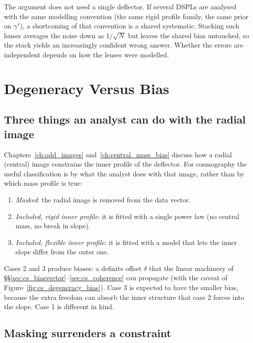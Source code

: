 \begin{annotation}
The argument does not need a single deflector. If several DSPLs are
analysed with the same modelling convention (the same rigid
profile family, the same prior on $\gamma'$), a shortcoming of that
convention is a shared systematic. Stacking such lenses averages the
noise down as $1/\sqrt N$ but leaves the shared bias untouched, so the
stack yields an increasingly confident wrong answer. Whether the errors
are independent depends on how the lenses were modelled.
\end{annotation}


\section{Degeneracy Versus Bias}
\label{sec:cs_degeneracy}

\subsection{Three things an analyst can do with the radial image}

Chapters~\ref{ch:odd_images} and~\ref{ch:central_mass_bias} discuss how
a radial (central) image constrains the inner profile of the deflector.
For cosmography the useful classification is by what the analyst does
with that image, rather than by which mass profile is true:
\begin{enumerate}
  \item \emph{Masked}: the radial image is removed from the data
  vector.
  \item \emph{Included, rigid inner profile}: it is fitted with a
  single power law (no central mass, no break in slope).
  \item \emph{Included, flexible inner profile}: it is fitted with a
  model that lets the inner slope differ from the outer one.
\end{enumerate}
Cases 2 and 3 produce biases: a definite offset $\delta$ that the
linear machinery of
\S\S\ref{sec:cs_biasvector}--\ref{sec:cs_coherence} can propagate (with
the caveat of Figure~\ref{fig:cs_degeneracy_bias}). Case 3 is expected
to have the smaller bias, because the extra freedom can absorb the inner
structure that case 2 forces into the slope. Case 1 is different in
kind.

\subsection{Masking surrenders a constraint}

